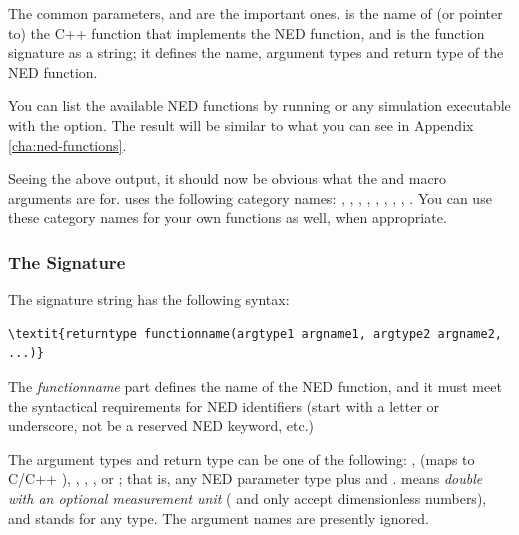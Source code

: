 The common parameters,  and  are the important
ones.  is the name of (or pointer to) the C++ function that
implements the NED function, and  is the function signature
as a string; it defines the name, argument types and return type of the NED
function.

You can list the available NED functions by running  or
any simulation executable with the  option.
The result will be similar to what you can see in Appendix
\ref{cha:ned-functions}.


Seeing the above output, it should now be obvious what the 
and  macro arguments are for. {\opp} uses the following
category names: , , ,
, , ,
, , . You can use these category names
for your own functions as well, when appropriate.


\subsubsection{The Signature}

The signature string has the following syntax:

\begin{Verbatim}[commandchars=\\\{\}]
\textit{returntype functionname(argtype1 argname1, argtype2 argname2, ...)}
\end{Verbatim}

The \textit{functionname} part defines the name of the NED function, and it
must meet the syntactical requirements for NED identifiers (start with a
letter or underscore, not be a reserved NED keyword, etc.)

The argument types and return type can be one of the following:
,  (maps to C/C++ ),
, , , 
or ; that is, any NED parameter type plus 
and .  means \textit{double with an
optional measurement unit} ( and  only
accept dimensionless numbers), and  stands for any type. The
argument names are presently ignored.

